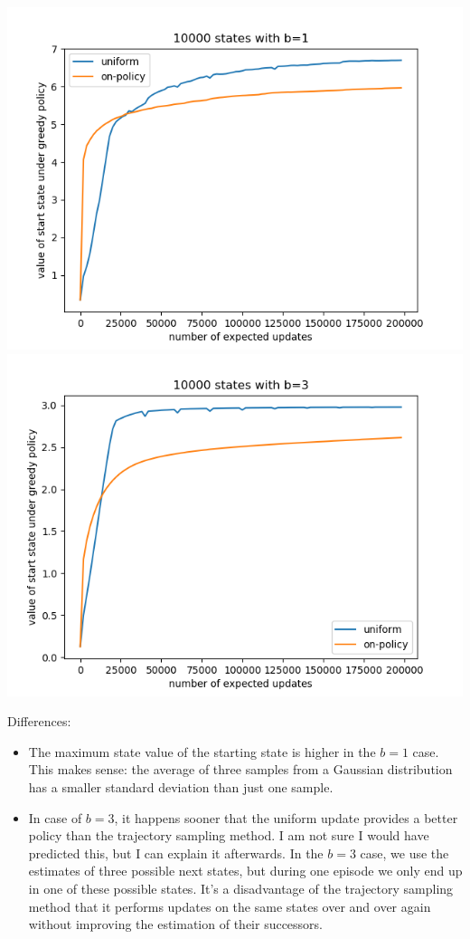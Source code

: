 \documentclass[12pt,a4paper]{article}
\begin{document}
\begin{enumerate}
    \begin{center}
      \includegraphics[scale=0.7]{num_states_10000_b_1}
      \includegraphics[scale=0.7]{num_states_10000_b_3}
    \end{center}

    Differences:
    \begin{itemize}
      \item The maximum state value of the starting state is higher in the $b = 1$ case.
      This makes sense: the average of three samples from a Gaussian distribution has
      a smaller standard deviation than just one sample.
      \item In case of $b = 3$, it happens sooner that the uniform update provides a better policy than
      the trajectory sampling method. I am not sure I would have predicted this, but I can explain
      it afterwards. In the $b = 3$ case, we use the estimates of three possible next states,
      but during one episode we only end up in one of these possible states. It's a disadvantage of the
      trajectory sampling method that it performs updates on the same states over and over again without
      improving the estimation of their successors.
    \end{itemize}

\end{enumerate}
\end{document}
